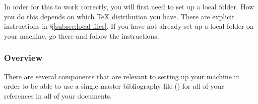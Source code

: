 In order for this to work correctly, you will first need to set up a local  folder.
How you do this depends on which \TeX{} distribution you have.
There are explicit instructions in \S\ref{subsec:local-files}.
If you have not already set up a local  folder on your machine, go there and follow the instructions.

\subsubsection{Overview}
\label{subsubsec:overview}

There are several components that are relevant to setting up your machine in order to be able to use a single master bibliography file () for all of your references in all of your  documents.

